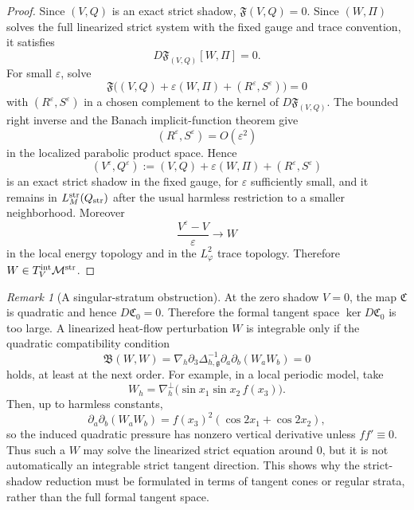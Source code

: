 \documentclass[11pt]{article}
\numberwithin{equation}{section}
\theoremstyle{plain}
\theoremstyle{definition}
\theoremstyle{remark}
\newtheorem{remark}{Remark}[section]
\newcommand{\str}{\mathrm{str}}
\begin{document}
\begin{proof}
Since \((V,Q)\) is an exact strict shadow, \(\mathfrak F(V,Q)=0\).  Since \((W,\Pi)\) solves the full linearized strict system with the fixed gauge and trace convention, it satisfies
\[
        D\mathfrak F_{(V,Q)}[W,\Pi]=0 .
\]
For small \(\varepsilon\), solve
\[
        \mathfrak F\big((V,Q)+\varepsilon(W,\Pi)+(R^\varepsilon,S^\varepsilon)\big)=0
\]
with \((R^\varepsilon,S^\varepsilon)\) in a chosen complement to the kernel of \(D\mathfrak F_{(V,Q)}\).  The bounded right inverse and the Banach implicit-function theorem give
\[
        (R^\varepsilon,S^\varepsilon)=O(\varepsilon^2)
\]
in the localized parabolic product space.  Hence
\[
        (V^\varepsilon,Q^\varepsilon)
        :=(V,Q)+\varepsilon(W,\Pi)+(R^\varepsilon,S^\varepsilon)
\]
is an exact strict shadow in the fixed gauge, for \(\varepsilon\) sufficiently small, and it remains in \(L_M^{\str}(Q_{\rm str})\) after the usual harmless restriction to a smaller neighborhood.  Moreover
\[
        \frac{V^\varepsilon-V}{\varepsilon}\to W
\]
in the local energy topology and in the \(L^2_\varphi\) trace topology.  Therefore \(W\in T^{\rm int}_V\mathcal M^{\str}\).
\end{proof}

\begin{remark}[A singular-stratum obstruction]\label{pII:rem:singular-stratum-obstruction}
At the zero shadow $V=0$, the map $\mathfrak C$ is quadratic and hence $D\mathfrak C_0=0$.  Therefore the formal tangent space $\ker D\mathfrak C_0$ is too large.  A linearized heat-flow perturbation $W$ is integrable only if the quadratic compatibility condition
\begin{equation}\label{pII:eq:quadratic-compatibility-zero}
        \mathfrak B(W,W)=
        \nabla_h\partial_3\Delta_{h,\mathfrak g}^{-1}
        \partial_a\partial_b(W_aW_b)=0
\end{equation}
holds, at least at the next order.  For example, in a local periodic model, take
\[
        W_h=\nabla_h^\perp\bigl(\sin x_1\sin x_2\,f(x_3)\bigr).
\]
Then, up to harmless constants,
\[
        \partial_a\partial_b(W_aW_b)
        =f(x_3)^2(\cos2x_1+\cos2x_2),
\]
so the induced quadratic pressure has nonzero vertical derivative unless $ff'\equiv0$.  Thus such a $W$ may solve the linearized strict equation around $0$, but it is not automatically an integrable strict tangent direction.  This shows why the strict-shadow reduction must be formulated in terms of tangent cones or regular strata, rather than the full formal tangent space.
\end{remark}
\end{document}
